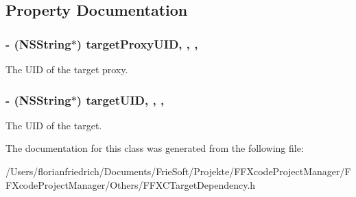 \subsection{Property Documentation}
\hypertarget{interface_f_f_x_c_target_dependency_a59997ab5494a7d486b1d646658360208}{
\subsubsection[{target\-Proxy\-U\-I\-D}]{\setlength{\rightskip}{0pt plus 5cm}-\/ (N\-S\-String$\ast$) target\-Proxy\-U\-I\-D\hspace{0.3cm}{\ttfamily [read]}, {\ttfamily [write]}, {\ttfamily [nonatomic]}, {\ttfamily [strong]}}}\label{interface_f_f_x_c_target_dependency_a59997ab5494a7d486b1d646658360208}
The U\-I\-D of the target proxy. \hypertarget{interface_f_f_x_c_target_dependency_a96bf590ddc42a06e6664800e32a9ff05}{
\subsubsection[{target\-U\-I\-D}]{\setlength{\rightskip}{0pt plus 5cm}-\/ (N\-S\-String$\ast$) target\-U\-I\-D\hspace{0.3cm}{\ttfamily [read]}, {\ttfamily [write]}, {\ttfamily [nonatomic]}, {\ttfamily [strong]}}}\label{interface_f_f_x_c_target_dependency_a96bf590ddc42a06e6664800e32a9ff05}
The U\-I\-D of the target. 

The documentation for this class was generated from the following file\-:\begin{DoxyCompactItemize}
\item 
/\-Users/florianfriedrich/\-Documents/\-Frie\-Soft/\-Projekte/\-F\-F\-Xcode\-Project\-Manager/\-F\-F\-Xcode\-Project\-Manager/\-Others/F\-F\-X\-C\-Target\-Dependency.\-h\end{DoxyCompactItemize}

